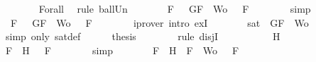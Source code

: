 \begin{isabellebody}
\ \ \ \ \ \ \isamarkupfalse%
\ Forall{}\ \isamarkupfalse%
\ {\isacharparenleft}rule\ ball{\isacharunderscore}Un{\isacharparenright}\isanewline
\ \ \ \ \isamarkupfalse%
\ \isamarkupfalse%
\ {\isachardoublequoteopen}{\isasymforall}F\ {\isasymin}\ {\isacharbraceleft}\isactrlbold {\isasymnot}\ G{\isacharcomma}F{\isacharbraceright}\ {\isasymunion}\ Wo{\isachardot}\ {\isasymA}\ {\isasymTurnstile}\ F{\isachardoublequoteclose}\isanewline
\ \ \ \ \ \ \isamarkupfalse%
\ simp\isanewline
\ \ \ \ \isamarkupfalse%
\ \isamarkupfalse%
\ {\isachardoublequoteopen}{\isasymexists}{\isasymA}{\isachardot}\ {\isasymforall}F\ {\isasymin}\ {\isacharparenleft}{\isacharbraceleft}\isactrlbold {\isasymnot}\ G{\isacharcomma}F{\isacharbraceright}\ {\isasymunion}\ Wo{\isacharparenright}{\isachardot}\ {\isasymA}\ {\isasymTurnstile}\ F{\isachardoublequoteclose}\isanewline
\ \ \ \ \ \ \isamarkupfalse%
\ {\isacharparenleft}iprover\ intro{\isacharcolon}\ exI{\isacharparenright}\isanewline
\ \ \ \ \isamarkupfalse%
\ \isamarkupfalse%
\ {\isachardoublequoteopen}sat\ {\isacharparenleft}{\isacharbraceleft}\isactrlbold {\isasymnot}\ G{\isacharcomma}F{\isacharbraceright}\ {\isasymunion}\ Wo{\isacharparenright}{\isachardoublequoteclose}\isanewline
\ \ \ \ \ \ \isamarkupfalse%
\ {\isacharparenleft}simp\ only{\isacharcolon}\ sat{\isacharunderscore}def{\isacharparenright}\isanewline
\ \ \ \ \isamarkupfalse%
\ {\isacharquery}thesis\isanewline
\ \ \ \ \ \ \isamarkupfalse%
\ {\isacharparenleft}rule\ disjI{}{\isacharparenright}\isanewline
\ \ \isamarkupfalse%
\isanewline
\ \ \ \ \isamarkupfalse%
\ {\isachardoublequoteopen}{\isasymA}\ {\isasymTurnstile}\ H{\isachardoublequoteclose}\isanewline
\ \ \ \ \isamarkupfalse%
\ \isamarkupfalse%
\ {\isachardoublequoteopen}{\isasymforall}F\ {\isasymin}\ {\isacharbraceleft}H{\isacharbraceright}{\isachardot}\ {\isasymA}\ {\isasymTurnstile}\ F{\isachardoublequoteclose}\isanewline
\ \ \ \ \ \ \isamarkupfalse%
\ simp\isanewline
\ \ \ \ \isamarkupfalse%
\ \isamarkupfalse%
\ {\isachardoublequoteopen}{\isasymforall}F\ {\isasymin}\ {\isacharparenleft}{\isacharbraceleft}H{\isacharbraceright}\ {\isasymunion}\ {\isacharparenleft}{\isacharbraceleft}F{\isacharbraceright}\ {\isasymunion}\ Wo{\isacharparenright}{\isacharparenright}{\isachardot}\ {\isasymA}\ {\isasymTurnstile}\ F{\isachardoublequoteclose}\isanewline

\end{isabellebody}
